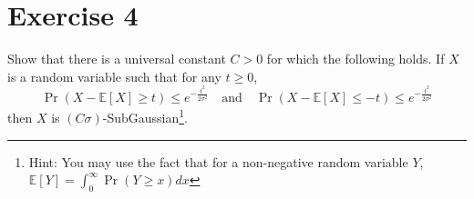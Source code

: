 \documentclass[a4 paper]{article}
\theoremstyle{boldStyle}
\theoremstyle{boldBlueStyle}
\theoremstyle{boldPurpleStyle}
\theoremstyle{boldRedStyle}
\begin{document}
\newpage
\section*{Exercise 4}
\textcolor{blueColor}{
Show that there is a universal constant \(C > 0\) for which the following holds. If \(X\) is a random variable such that for any \(t \geq 0\),
\[
\Pr(X - \mathbb{E}[X] \geq t) \leq e^{-\frac{t^2}{2\sigma^2}} \quad \text{and} \quad \Pr(X - \mathbb{E}[X] \leq -t) \leq e^{-\frac{t^2}{2\sigma^2}}
\]
then \(X\) is \((C\sigma)\)-SubGaussian\footnote{Hint: You may use the fact that for a non-negative random variable \(Y\), \(\mathbb{E}[Y] = \int_0^\infty \Pr(Y \geq x)dx\)}.
}
\end{document}

